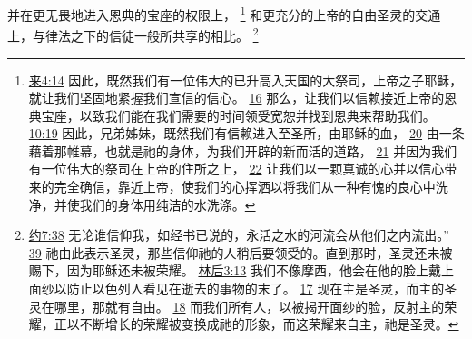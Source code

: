 \documentclass[12pt, a4paper, oneside]{ctexart}
\begin{document}
	并在更无畏地进入恩典的宝座的权限上，
	\footnote {
		\href{https://biblehub.com/hebrews/4-14.htm}{来4:14} 因此，既然我们有一位伟大的已升高入天国的大祭司，上帝之子耶稣，就让我们坚固地紧握我们宣信的信心。
		\href{https://biblehub.com/hebrews/4-16.htm}{16} 那么，让我们以信赖接近上帝的恩典宝座，以致我们能在我们需要的时间领受宽恕并找到恩典来帮助我们。
		\href{https://biblehub.com/hebrews/10-19.htm}{10:19} 因此，兄弟姊妹，既然我们有信赖进入至圣所，由耶稣的血，
		\href{https://biblehub.com/hebrews/10-20.htm}{20} 由一条藉着那帷幕，也就是祂的身体，为我们开辟的新而活的道路，
		\href{https://biblehub.com/hebrews/10-21.htm}{21} 并因为我们有一位伟大的祭司在上帝的住所之上，
		\href{https://biblehub.com/hebrews/10-22.htm}{22} 让我们以一颗真诚的心并以信心带来的完全确信，靠近上帝，使我们的心挥洒以将我们从一种有愧的良心中洗净，并使我们的身体用纯洁的水洗涤。
	}
	和更充分的上帝的自由圣灵的交通上，与律法之下的信徒一般所共享的相比。
	\footnote {
		\href{https://biblehub.com/john/7-38.htm}{约7:38} 无论谁信仰我，如经书已说的，永活之水的河流会从他们之内流出。”
		\href{https://biblehub.com/john/7-39.htm}{39} 祂由此表示圣灵，那些信仰祂的人稍后要领受的。直到那时，圣灵还未被赐下，因为耶稣还未被荣耀。
		\href{https://biblehub.com/2_corinthians/3-13.htm}{林后3:13} 我们不像摩西，他会在他的脸上戴上面纱以防止以色列人看见在逝去的事物的末了。
		\href{https://biblehub.com/2_corinthians/3-17.htm}{17} 现在主是圣灵，而主的圣灵在哪里，那就有自由。
		\href{https://biblehub.com/2_corinthians/3-18.htm}{18} 而我们所有人，以被揭开面纱的脸，反射主的荣耀，正以不断增长的荣耀被变换成祂的形象，而这荣耀来自主，祂是圣灵。
	}
\end{document}
